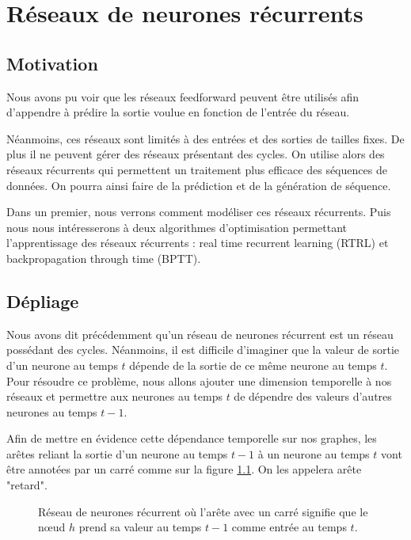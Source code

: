 \chapter{Réseaux de neurones récurrents}

\section{Motivation}

Nous avons pu voir que les réseaux feedforward peuvent être utilisés afin d'appendre à prédire la sortie voulue en fonction de l'entrée du réseau. 

Néanmoins, ces réseaux sont limités à des entrées et des sorties de tailles fixes. De plus il ne peuvent gérer des réseaux présentant des cycles. On utilise alors des réseaux récurrents qui permettent un traitement plus efficace des séquences de données. On pourra ainsi faire de la prédiction et de la génération de séquence.

Dans un premier, nous verrons comment modéliser ces réseaux récurrents. Puis nous nous intéresserons à deux algorithmes d'optimisation permettant l'apprentissage des réseaux récurrents : real time recurrent learning (RTRL) et backpropagation through time (BPTT).

\section{Dépliage}

Nous avons dit précédemment qu'un réseau de neurones récurrent est un réseau possédant des cycles. Néanmoins, il est difficile d'imaginer que la valeur de sortie d'un neurone au temps $t$ dépende de la sortie de ce même neurone au temps $t$. Pour résoudre ce problème, nous allons ajouter une dimension temporelle à nos réseaux et permettre aux neurones au temps $t$ de dépendre des valeurs d'autres neurones au temps $t-1$.

Afin de mettre en évidence cette dépendance temporelle sur nos graphes, les arêtes reliant la sortie d'un neurone au temps $t-1$ à un neurone au temps $t$ vont être annotées par un carré comme sur la figure \ref{arete_retard}. On les appelera arête "retard".

\begin{figure}
\begin{center}

\caption{Réseau de neurones récurrent où l'arête avec un carré signifie que le n\oe{}ud $h$ prend sa valeur au temps $t-1$ comme entrée au temps $t$.}
\label{arete_retard}
\end{center}
\end{figure}

